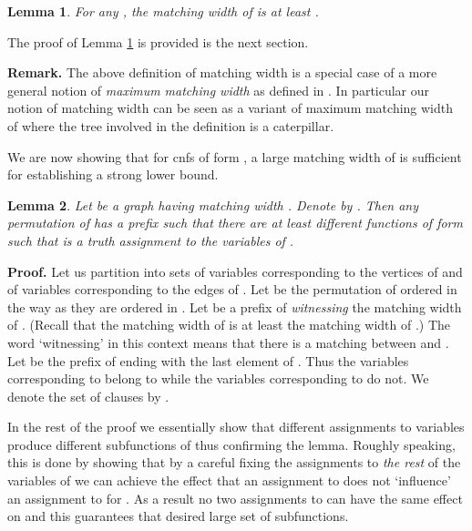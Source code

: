 \documentclass{article}
\newtheorem{lemma}{Lemma}
\begin{document}
\begin{lemma} \label{cltreemt}
For any ,
the matching width of  is at least .
\end{lemma}

The proof of Lemma \ref{cltreemt} is provided is the next section.

{\bf Remark.} The above definition of matching width is a special 
case of a more general notion of \emph{maximum matching width} as defined
in \cite{VaThesis}. In particular our notion of matching width can be seen
as a variant of maximum matching width of \cite{VaThesis} 
where the tree  involved in the definition is a caterpillar. 

\begin{comment}
Then, applying Lemma 4.2.4 of \cite{VaThesis} to this case, one
can observe that , where  is the pathwidth of .
It is well known that the pathwidth of  is at least  \cite{Bod98}. Furthermore, since
all the vertices of a clique get into the same bag in any path decomposition, this
lower bound is immediately extended to  for , immediately implying
a bound slightly above  for . 
\end{comment}

We are now showing that for {\sc cnf}s of form , a large matching width
of  is sufficient for establishing a strong lower bound. 

\begin{lemma} \label{manyass}
Let  be a graph having matching width .
Denote  by . Then any permutation 
of  has a prefix  such that 
there are at least  different functions of form 
such that  is a truth assignment to the variables of .
\end{lemma}


{\bf Proof.}
Let us partition  into sets  of variables corresponding to
the vertices of  and  of variables corresponding to the edges of 
. Let  be the permutation of  ordered in the way as they are ordered
in . Let  be a prefix of  \emph{witnessing} the matching width  of .
(Recall that the matching width of  is at least the matching width of .)
The word `witnessing' in this context means that there is a matching
 between  and . 
Let  be the prefix of  ending with the last element of .
Thus the variables  corresponding to  belong to
 while the variables  corresponding to 
do not. We denote the set of clauses  by .


In the rest of the proof we essentially show that  different assignments to variables
 produce  different subfunctions of  thus confirming the
lemma. Roughly speaking, this is done by showing that by a careful fixing the
assignments to \emph{the rest} of the variables of  we can achieve the
effect that an assignment to  does not `influence' an assignment to  for
. As a result no two assignments to  can have the same
effect on  and this guarantees that desired large set of subfunctions.
\end{document}

